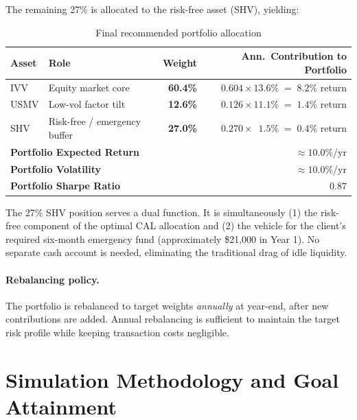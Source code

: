 \documentclass[12pt, letterpaper]{article}
\begin{document}
The remaining 27\% is allocated to the risk-free asset (SHV), yielding:

\begin{table}[H]
  \centering
  \caption{Final recommended portfolio allocation}
  \label{tab:final}
  \begin{tabular}{llrr}
    \toprule
    \textbf{Asset} & \textbf{Role} & \textbf{Weight} & \textbf{Ann.\ Contribution to Portfolio} \\
    \midrule
    IVV  & Equity market core   & \textbf{60.4\%} & $0.604 \times 13.6\%\;=\;8.2\%$ return \\
    USMV & Low-vol factor tilt  & \textbf{12.6\%} & $0.126 \times 11.1\%\;=\;1.4\%$ return \\
    SHV  & Risk-free / emergency buffer & \textbf{27.0\%} & $0.270 \times\phantom{0}1.5\%\;=\;0.4\%$ return \\
    \midrule
    \multicolumn{2}{l}{\textbf{Portfolio Expected Return}} & \multicolumn{2}{r}{$\approx10.0\%$/yr} \\
    \multicolumn{2}{l}{\textbf{Portfolio Volatility}}      & \multicolumn{2}{r}{$\approx10.0\%$/yr} \\
    \multicolumn{2}{l}{\textbf{Portfolio Sharpe Ratio}}    & \multicolumn{2}{r}{$0.87$} \\
    \bottomrule
  \end{tabular}
\end{table}

The 27\% SHV position serves a dual function.  It is simultaneously (1) the risk-free
component of the optimal CAL allocation and (2) the vehicle for the client's required
six-month emergency fund (approximately \$21{,}000 in Year 1).  No separate cash
account is needed, eliminating the traditional drag of idle liquidity.

\paragraph{Rebalancing policy.}
The portfolio is rebalanced to target weights \textit{annually} at year-end,
after new contributions are added.  Annual rebalancing is sufficient to maintain
the target risk profile while keeping transaction costs negligible.

\section{Simulation Methodology and Goal Attainment}
\label{sec:simulation}
\end{document}
